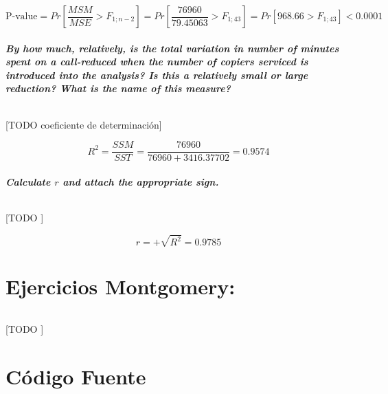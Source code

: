 \documentclass{article}
\begin{document}
        \begin{equation}
          \text{P-value} = Pr\left[\frac{MSM}{MSE} > F_{1;n-2}\right] =
          Pr\left[\frac{76960}{79.45063} > F_{1;43}\right] =
          Pr\left[968.66 > F_{1;43}\right] <
          0.0001
        \end{equation}

      \subsubsection{By how much, relatively, is the total variation in number of minutes spent on a call-reduced when the number of copiers serviced is introduced into the analysis? Is this a relatively small or large reduction? What is the name of this measure?}

        \paragraph{}
        [TODO coeficiente de determinación]

        \begin{equation}
          R^2 = \frac{SSM}{SST} = \frac{76960}{76960 + 3416.37702} = 0.9574
        \end{equation}

      \subsubsection{Calculate $r$ and attach the appropriate sign.}

        \paragraph{}
        [TODO ]

        \begin{equation}
          r = + \sqrt{R^2} = 0.9785
        \end{equation}

  \part{Ejercicios Montgomery:}

    \paragraph{}
    [TODO ]


  \part{Código Fuente}
\end{document}
